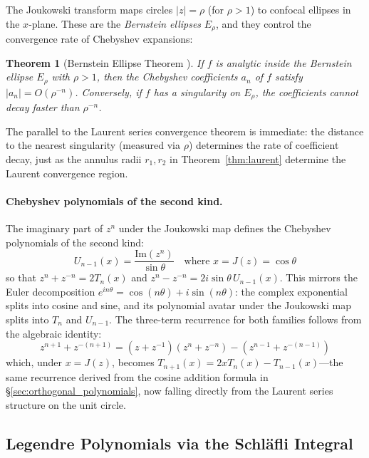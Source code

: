 \documentclass[12pt,a4paper]{report}
\theoremstyle{thms}
\newtheorem{theorem}{Theorem}[section]
\theoremstyle{defns}
\begin{document}
The Joukowski transform maps circles $|z| = \rho$ (for $\rho > 1$) to confocal ellipses in the $x$-plane. These are the \textit{Bernstein ellipses} $E_\rho$, and they control the convergence rate of Chebyshev expansions:

\begin{theorem}[Bernstein Ellipse Theorem \cite{trefethen_atap}]
    If $f$ is analytic inside the Bernstein ellipse $E_\rho$ with $\rho > 1$, then the Chebyshev coefficients $a_n$ of $f$ satisfy $|a_n| = O(\rho^{-n})$. Conversely, if $f$ has a singularity on $E_\rho$, the coefficients cannot decay faster than $\rho^{-n}$.
    \label{thm:bernstein_ellipse}
\end{theorem}

The parallel to the Laurent series convergence theorem is immediate: the distance to the nearest singularity (measured via $\rho$) determines the rate of coefficient decay, just as the annulus radii $r_1, r_2$ in Theorem~\ref{thm:laurent} determine the Laurent convergence region.

\paragraph{Chebyshev polynomials of the second kind.} The imaginary part of $z^n$ under the Joukowski map defines the Chebyshev polynomials of the second kind:
\begin{equation}
    U_{n-1}(x) = \dfrac{\mathrm{Im}(z^n)}{\sin\theta} \quad \text{where } x = J(z) = \cos\theta
\end{equation}
so that $z^n + z^{-n} = 2T_n(x)$ and $z^n - z^{-n} = 2i\sin\theta\,U_{n-1}(x)$. This mirrors the Euler decomposition $e^{in\theta} = \cos(n\theta) + i\sin(n\theta)$: the complex exponential splits into cosine and sine, and its polynomial avatar under the Joukowski map splits into $T_n$ and $U_{n-1}$. The three-term recurrence for both families follows from the algebraic identity:
\begin{equation}
    z^{n+1} + z^{-(n+1)} = (z + z^{-1})(z^n + z^{-n}) - (z^{n-1} + z^{-(n-1)})
\end{equation}
which, under $x = J(z)$, becomes $T_{n+1}(x) = 2xT_n(x) - T_{n-1}(x)$—the same recurrence derived from the cosine addition formula in \S\ref{sec:orthogonal_polynomials}, now falling directly from the Laurent series structure on the unit circle.

\subsection{Legendre Polynomials via the Schl\"{a}fli Integral}
\end{document}
